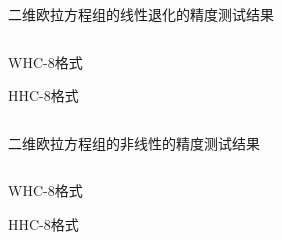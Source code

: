 \documentclass[aspectratio=169]{beamer}
\begin{document}
\begin{frame}{二维欧拉方程组的线性退化的精度测试结果}
  
  \vspace{-3mm}
  \begin{columns}
    \begin{column}{0.2\textwidth}
      
      \centering
      
      WHC-8格式
      
      \vspace{0.4\textheight}
      
      HHC-8格式
      
    \end{column}
    \begin{column}{0.8\textwidth}
      \begin{tiny}
        
      \end{tiny}
    \end{column}
  \end{columns}
  
\end{frame}

\begin{frame}{二维欧拉方程组的非线性的精度测试结果}
  
  \vspace{-3mm}
  \begin{columns}
    \begin{column}{0.2\textwidth}
      
      \centering
      
      WHC-8格式
      
      \vspace{0.4\textheight}
      
      HHC-8格式
      
    \end{column}
    \begin{column}{0.8\textwidth}
      \begin{tiny}
        
      \end{tiny}
    \end{column}
  \end{columns}
  
\end{frame}
\end{document}
